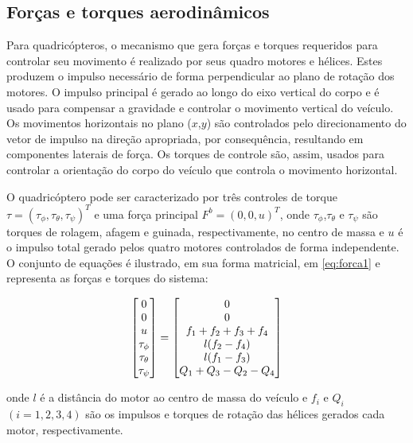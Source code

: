\documentclass[a4paper, 12pt]{article}
\begin{document}
\subsection{Forças e torques aerodinâmicos}

Para quadricópteros, o mecanismo que gera forças e torques requeridos para controlar seu movimento é realizado por seus quadro motores e hélices. Estes produzem o impulso necessário de forma perpendicular ao plano de rotação dos motores. O impulso principal é gerado ao longo do eixo vertical do corpo e é usado para compensar a gravidade e controlar o movimento vertical do veículo. Os movimentos horizontais no plano ($x$,$y$) são controlados pelo direcionamento do vetor de impulso na direção apropriada, por consequência, resultando em componentes laterais de força. Os torques de controle são, assim, usados para controlar a orientação do corpo do veículo que controla o movimento horizontal.

O quadricóptero pode ser caracterizado por três controles de torque $\tau = (\tau_\phi,\tau_\theta,\tau_\psi)^T$ e uma força principal $F^b = (0,0,u)^T$, onde $\tau_\phi$,$\tau_\theta$ e $\tau_\psi$ são torques de rolagem, afagem e guinada, respectivamente, no centro de massa e $u$ é o impulso total gerado pelos quatro motores controlados de forma independente. O conjunto de equações é ilustrado, em sua forma matricial, em \ref{eq:forca1} e representa  as forças e torques do sistema:

\begin{equation}
\centering
\begin{bmatrix} 
    0 \\ 0 \\ u \\ \tau _{ \phi  } \\ \tau _{ \theta  } \\ \tau _{ \psi  } 
\end{bmatrix}   =
\begin{bmatrix} 0 \\ 0 \\ { { f }_{ 1 }+{ f }_{ 2 }+{ f }_{ 3 }+{ f }_{ 4 } } \\ l({ f }_{ 2 }-{ f }_{ 4 }) \\ l({ f }_{ 1 }-{ f }_{ 3 }) \\ Q_1 + Q_3 - Q_2 - Q_4
 \end{bmatrix}
\label{eq:forca1}
\end{equation}

\noindent onde $l$ é a distância do motor ao centro de massa do veículo e $f_i$ e $Q_i$ $(i=1,2,3,4)$  são os impulsos e torques de rotação das hélices gerados cada motor, respectivamente. 
\end{document}
